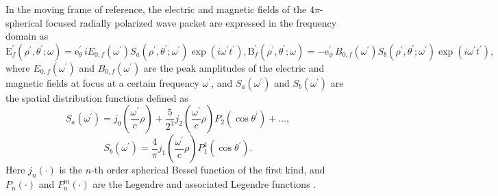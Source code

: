 \documentclass[10pt, a4paper, twoside, openright]{report}
\renewcommand{\vec}[1]{\boldsymbol{\mathrm{#1}}}
\begin{document}
In the moving frame of reference, the electric and magnetic fields of the $ 4 \pi $-spherical focused radially polarized wave packet are expressed in the frequency domain as \cite{Jeong2020, Jeong2021}
\begin{subequations}
\begin{equation}\label{eq:E_field_4pi}
\vec{E}^{\prime}_{f} \left( \rho^{\prime}, \theta^{\prime}; \omega \right) = \vec{e}_{\theta}^{\prime} \, i E_{0, f} \left( \omega^{\prime} \right) S_a \left( \rho^{\prime}, \theta^{\prime}; \omega^{\prime} \right) \exp \left(i \omega^{\prime} t^{\prime} \right),
\end{equation}
\begin{equation}\label{eq:B_field_4pi}
\vec{B}^{\prime}_{f} \left( \rho^{\prime}, \theta^{\prime}; \omega \right) = - \vec{e}_{\phi}^{\prime} \, B_{0, f} \left( \omega^{\prime} \right) S_b \left( \rho^{\prime}, \theta^{\prime}; \omega^{\prime} \right) \exp \left(i \omega^{\prime} t^{\prime} \right),
\end{equation}
\end{subequations}
where $ E_{0, f} \left( \omega^{\prime} \right) $ and $ B_{0, f} \left( \omega^{\prime} \right) $ are the peak amplitudes of the electric and magnetic fields at focus at a certain frequency $ \omega^{\prime} $, and $ S_a \left( \omega^{\prime} \right) $ and $ S_b \left( \omega^{\prime} \right) $ are the spatial distribution functions defined as \cite{Jeong2020, Jeong2021}
\begin{equation}\label{eq:S_a}
S_a \left( \omega^{\prime} \right) = j_0 \left( \frac{\omega^{\prime}}{c} \rho \right) + \frac{5}{2^3} j_2 \left( \frac{\omega^{\prime}}{c} \rho \right) P_2 \left( \cos \theta^{\prime} \right) + \dots,
\end{equation}
\begin{equation}\label{eq:S_b}
S_b \left( \omega^{\prime} \right) = \frac{4}{\pi} j_1 \left( \frac{\omega^{\prime}}{c} \rho \right) P^1_1 \left( \cos \theta^{\prime} \right).
\end{equation}
Here $ j_{n} \left( \cdot \right) $ is the $ n $-th order spherical Bessel function of the first kind, and $ P_n \left( \cdot \right) $ and $ P^m_n \left( \cdot \right) $ are the Legendre and associated Legendre functions \cite{Gradshteyn1980}.
\end{document}

